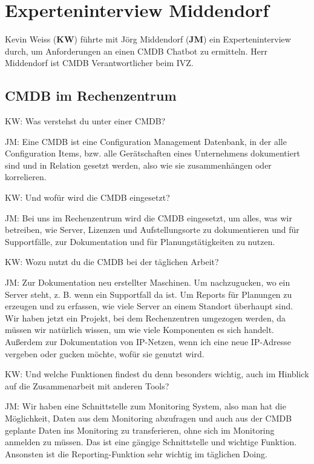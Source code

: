 \chapter{Experteninterview Middendorf}\label{Interview_Middendorf}

Kevin Weiss (\textbf{KW}) führte mit Jörg Middendorf (\textbf{JM}) ein Experteninterview  durch, um Anforderungen an einen CMDB Chatbot zu ermitteln. Herr Middendorf ist CMDB Verantwortlicher beim IVZ.

\section*{CMDB im Rechenzentrum}

\begin{list}{X:}{\setlength{\labelsep}{5mm}}
\item[KW:] Was verstehst du unter einer CMDB? 
\item[JM:] Eine CMDB ist eine Configuration Management Datenbank, in der alle Configuration Items, bzw. alle Gerätschaften eines Unternehmens dokumentiert sind und in Relation gesetzt werden, also wie sie zusammenhängen oder korrelieren.
\item[KW:] Und wofür wird die CMDB eingesetzt?
\item[JM:] Bei uns im Rechenzentrum wird die CMDB eingesetzt, um alles, was wir betreiben, wie Server, Lizenzen und Aufstellungsorte zu dokumentieren und für Supportfälle, zur Dokumentation und für Planungstätigkeiten zu nutzen.
\item[KW:] Wozu nutzt du die CMDB bei der täglichen Arbeit?
\item[JM:] Zur Dokumentation neu erstellter Maschinen. Um nachzugucken, wo ein Server steht, z. B. wenn ein Supportfall da ist. Um Reports für Planungen zu erzeugen und zu erfassen, wie viele Server an einem Standort überhaupt sind.\\ Wir haben jetzt ein Projekt, bei dem Rechenzentren umgezogen werden, da müssen wir natürlich wissen, um wie viele Komponenten es sich handelt. Außerdem zur Dokumentation von IP-Netzen, wenn ich eine neue IP-Adresse vergeben oder gucken möchte, wofür sie genutzt wird. 
\item[KW:] Und welche Funktionen findest du denn besonders wichtig, auch im Hinblick auf die Zusammenarbeit mit anderen Tools?
\item[JM:] Wir haben eine Schnittstelle zum Monitoring System, also man hat die Möglichkeit, Daten aus dem Monitoring abzufragen und auch aus der CMDB geplante Daten ins Monitoring zu transferieren, ohne sich im Monitoring anmelden zu müssen. Das ist eine gängige Schnittstelle und wichtige Funktion. Ansonsten ist die Reporting-Funktion sehr wichtig im täglichen Doing.
\end{list}

